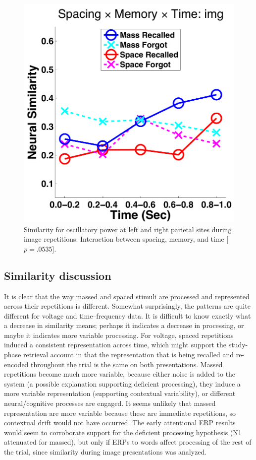 \begin{figure}
  \centering
  \includegraphics[width=.40\textwidth]{./figs/exp1/similarity_spacXmemXtime_img_pow_LPSRPS_0to200_200to400_400to600_600to800_800to1000_kaiser_cosine}
  \caption{Similarity for oscillatory power at left and right parietal sites during image repetitions: Interaction between spacing, memory, and time [$p=.0535$].}
  \label{fig:sim_pow_spacXmemXtime}
\end{figure}

\subsection{Similarity discussion}

It is clear that the way massed and spaced stimuli are processed and represented across their repetitions is different.  Somewhat surprisingly, the patterns are quite different for voltage and time--frequency data.  It is difficult to know exactly what a decrease in similarity means; perhaps it indicates a decrease in processing, or maybe it indicates more variable processing.  For voltage, spaced repetitions induced a consistent representation across time, which might support the study-phase retrieval account in that the representation that is being recalled and re-encoded throughout the trial is the same on both presentations.  Massed repetitions become much more variable, because either noise is added to the system (a possible explanation supporting deficient processing), they induce a more variable representation (supporting contextual variability), or different neural/cognitive processes are engaged.  It seems unlikely that massed representation are more variable because these are immediate repetitions, so contextual drift would not have occurred.
The early attentional ERP results would seem to corroborate support for the deficient processing hypothesis (N1 attenuated for massed), but only if ERPs to words affect processing of the rest of the trial, since similarity during image presentations was analyzed.

